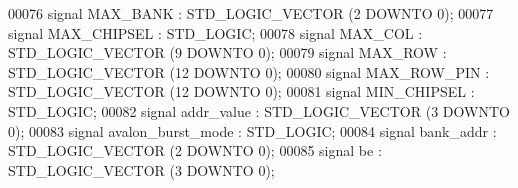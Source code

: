 \begin{DoxyCode}
00076                 \textcolor{keywordflow}{signal} \textcolor{vhdlchar}{MAX_BANK} \textcolor{vhdlchar}{:}  \textcolor{comment}{STD\_LOGIC\_VECTOR} \textcolor{vhdlchar}{(}\textcolor{vhdllogic}{}\textcolor{vhdllogic}{2} \textcolor{keywordflow}{DOWNTO} \textcolor{vhdllogic}{}\textcolor{vhdllogic}{0}\textcolor{vhdlchar}{)};
00077                 \textcolor{keywordflow}{signal} \textcolor{vhdlchar}{MAX_CHIPSEL} \textcolor{vhdlchar}{:}  \textcolor{comment}{STD\_LOGIC};
00078                 \textcolor{keywordflow}{signal} \textcolor{vhdlchar}{MAX_COL} \textcolor{vhdlchar}{:}  \textcolor{comment}{STD\_LOGIC\_VECTOR} \textcolor{vhdlchar}{(}\textcolor{vhdllogic}{}\textcolor{vhdllogic}{9} \textcolor{keywordflow}{DOWNTO} \textcolor{vhdllogic}{}\textcolor{vhdllogic}{0}\textcolor{vhdlchar}{)};
00079                 \textcolor{keywordflow}{signal} \textcolor{vhdlchar}{MAX_ROW} \textcolor{vhdlchar}{:}  \textcolor{comment}{STD\_LOGIC\_VECTOR} \textcolor{vhdlchar}{(}\textcolor{vhdllogic}{}\textcolor{vhdllogic}{12} \textcolor{keywordflow}{DOWNTO} \textcolor{vhdllogic}{}\textcolor{vhdllogic}{0}\textcolor{vhdlchar}{)};
00080                 \textcolor{keywordflow}{signal} \textcolor{vhdlchar}{MAX_ROW_PIN} \textcolor{vhdlchar}{:}  \textcolor{comment}{STD\_LOGIC\_VECTOR} \textcolor{vhdlchar}{(}\textcolor{vhdllogic}{}\textcolor{vhdllogic}{12} \textcolor{keywordflow}{DOWNTO} \textcolor{vhdllogic}{}\textcolor{vhdllogic}{0}\textcolor{vhdlchar}{)};
00081                 \textcolor{keywordflow}{signal} \textcolor{vhdlchar}{MIN_CHIPSEL} \textcolor{vhdlchar}{:}  \textcolor{comment}{STD\_LOGIC};
00082                 \textcolor{keywordflow}{signal} \textcolor{vhdlchar}{addr_value} \textcolor{vhdlchar}{:}  \textcolor{comment}{STD\_LOGIC\_VECTOR} \textcolor{vhdlchar}{(}\textcolor{vhdllogic}{}\textcolor{vhdllogic}{3} \textcolor{keywordflow}{DOWNTO} \textcolor{vhdllogic}{}\textcolor{vhdllogic}{0}\textcolor{vhdlchar}{)};
00083                 \textcolor{keywordflow}{signal} \textcolor{vhdlchar}{avalon_burst_mode} \textcolor{vhdlchar}{:}  \textcolor{comment}{STD\_LOGIC};
00084                 \textcolor{keywordflow}{signal} \textcolor{vhdlchar}{bank_addr} \textcolor{vhdlchar}{:}  \textcolor{comment}{STD\_LOGIC\_VECTOR} \textcolor{vhdlchar}{(}\textcolor{vhdllogic}{}\textcolor{vhdllogic}{2} \textcolor{keywordflow}{DOWNTO} \textcolor{vhdllogic}{}\textcolor{vhdllogic}{0}\textcolor{vhdlchar}{)};
00085                 \textcolor{keywordflow}{signal} \textcolor{vhdlchar}{be} \textcolor{vhdlchar}{:}  \textcolor{comment}{STD\_LOGIC\_VECTOR} \textcolor{vhdlchar}{(}\textcolor{vhdllogic}{}\textcolor{vhdllogic}{3} \textcolor{keywordflow}{DOWNTO} \textcolor{vhdllogic}{}\textcolor{vhdllogic}{0}\textcolor{vhdlchar}{)};

\end{DoxyCode}

